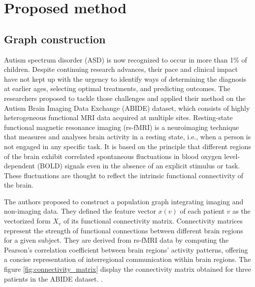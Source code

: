 
\section{Proposed method}

\subsection{Graph construction} 


Autism spectrum disorder (ASD) is now recognized to occur in more than 1\% of children. Despite continuing research advances, their pace and clinical impact have not kept up with the urgency to identify ways of determining the diagnosis at earlier ages, selecting optimal treatments, and predicting outcomes. The researchers \cite{Parisot17} proposed to tackle those challenges and applied their method on the Autism Brain Imaging Data Exchange (ABIDE) dataset, which consists of highly heterogeneous functional MRI data acquired at multiple sites. Resting-state functional magnetic resonance imaging (rs-fMRI) is a neuroimaging technique that measures and analyses brain activity in a resting state, i.e., when a person is not engaged in any specific task. 
It is based on the principle that different regions of the brain exhibit correlated spontaneous fluctuations in blood oxygen level-dependent (BOLD) signals even in the absence of an explicit stimulus or task. These fluctuations are thought to reflect the intrinsic functional connectivity of the brain. 

The authors \cite{Parisot17} proposed to construct a population graph integrating imaging and non-imaging data. 
They defined the feature vector $x(v)$ of each patient $v$ as the vectorized form $X_{v}$ of its functional connectivity matrix. Connectivity matrices represent the strength of functional connections between different brain regions for a given subject. They are derived from rs-fMRI data by computing the Pearson's correlation coefficient between brain regions' activity patterns, offering a concise representation of interregional communication within brain regions. The figure \ref{fig:connectivity_matrix} display the connectivity matrix obtained for three patients in the ABIDE dataset. .  

